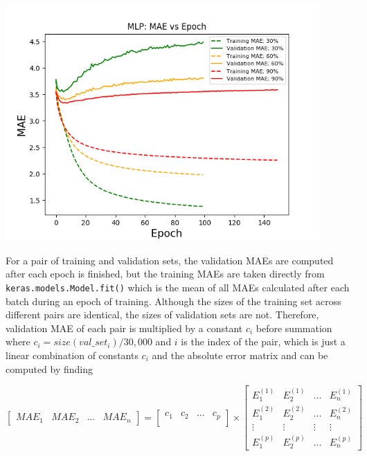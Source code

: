 \documentclass[12pt]{article}
\begin{document}
        \begin{center}
          \includegraphics[width=0.9\textwidth]{mlp_mae.png}
        \end{center}

        \quad For a pair of training and validation sets, the validation MAEs are computed after each epoch is finished, but the training MAEs are taken directly from \texttt{keras.models.Model.fit()} which is the mean of all MAEs calculated after each batch during an epoch of training. Although the sizes of the training set across different pairs are identical, the sizes of validation sets are not. Therefore, validation MAE of each pair is multiplied by a constant $c_i$ before summation where $c_i=size(val\_set_i) / 30,000$ and $i$ is the index of the pair, which is just a linear combination of constants $c_i$ and the absolute error matrix and can be computed by finding

        \[
        \begin{bmatrix}
          MAE_1 & MAE_2 & \dots & MAE_n
        \end{bmatrix}
        =
        \begin{bmatrix}
          c_1 & c_2 & \dots & c_p \\
        \end{bmatrix}
        \times
        \begin{bmatrix}
          E_1^{(1)} & E_2^{(1)} & \dots  & E_n^{(1)} \\
          E_1^{(2)} & E_2^{(2)} & \dots  & E_n^{(2)} \\
          \vdots    & \vdots    & \vdots & \vdots \\
          E_1^{(p)} & E_2^{(p)} & \dots  & E_n^{(p)}
        \end{bmatrix}
        \]
\end{document}
